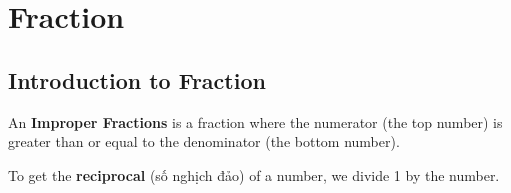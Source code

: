 
\chapter{Fraction}

\section{Introduction to Fraction}

An \textbf{Improper Fractions} is a fraction where the numerator (the top number) is greater than or equal to the denominator (the bottom number).

To get the \textbf{reciprocal} (số nghịch đảo) of a number, we divide 1 by the number.
